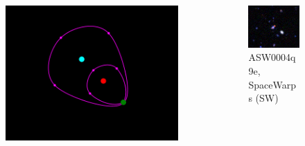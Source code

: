 \documentclass[aspectratio=1610]{beamer}
\begin{document}
%

\begin{frame}
  \begin{columns}[T]
    \begin{column}{5.5cm}
      \begin{figure}
        \includegraphics[width=\textwidth]{imgs/sl-3}
      \end{figure}
    \end{column}
    \begin{column}{5.5cm}
      \begin{figure}
        \includegraphics[width=\textwidth]{imgs/real3}
        \caption{ASW0004q9e, SpaceWarps (SW)}
      \end{figure}
    \end{column}
  \end{columns}
\end{frame}
\end{document}
